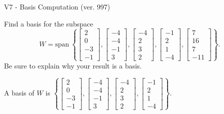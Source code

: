 \begin{exercise}
  \begin{exerciseTitle}V7 - Basis Computation (ver. 997)\end{exerciseTitle}
  \begin{exerciseStatement}
    Find a basis for the subspace 
\[W=\mathrm{span}\ \left\{\left[\begin{array}{r}
2 \\
0 \\
-3 \\
-1
\end{array}\right] , \left[\begin{array}{r}
-4 \\
-4 \\
-1 \\
3
\end{array}\right] , \left[\begin{array}{r}
-4 \\
2 \\
3 \\
2
\end{array}\right] , \left[\begin{array}{r}
-1 \\
2 \\
1 \\
-4
\end{array}\right] , \left[\begin{array}{r}
7 \\
16 \\
7 \\
-11
\end{array}\right]\right\}.\]
 Be sure to explain why your result is a basis.


  \end{exerciseStatement}
  \begin{exerciseAnswer}
   A basis of \(W\) is  \(\left\{\left[\begin{array}{r}
2 \\
0 \\
-3 \\
-1
\end{array}\right] , \left[\begin{array}{r}
-4 \\
-4 \\
-1 \\
3
\end{array}\right] , \left[\begin{array}{r}
-4 \\
2 \\
3 \\
2
\end{array}\right] , \left[\begin{array}{r}
-1 \\
2 \\
1 \\
-4
\end{array}\right]\right\}\).
  


  \end{exerciseAnswer}
\end{exercise}